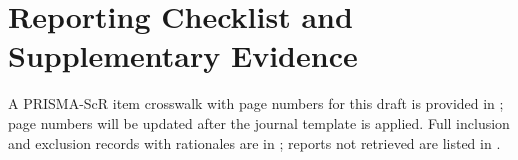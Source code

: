 \documentclass[journal]{IEEEtran}
\newif\ifreferencesready
\begin{document}
\section{Reporting Checklist and Supplementary Evidence}
\label{app:reporting}
A PRISMA-ScR item crosswalk with page numbers for this draft is provided in ; page numbers will be updated after the journal template is applied. Full inclusion and exclusion records with rationales are in ; reports not retrieved are listed in .

\ifreferencesready
  
  
\fi
\end{document}

